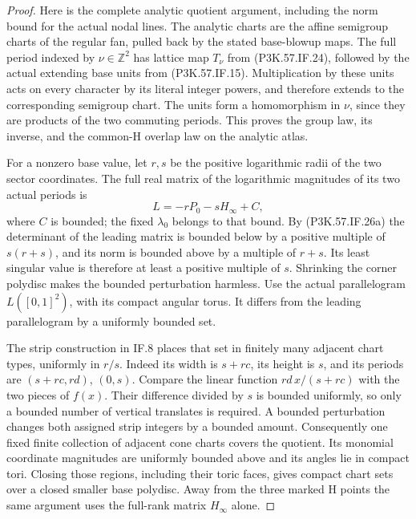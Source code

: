 \begin{proof}
Here is the complete analytic quotient argument, including the
norm bound for the actual nodal lines. The analytic charts are
the affine semigroup charts of the regular fan, pulled back by
the stated base-blowup maps. The full period indexed by
\(\nu\in\mathbb Z^2\) has lattice map \(T_\nu\) from
(P3K.57.IF.24), followed by the actual extending base units from
(P3K.57.IF.15). Multiplication by these units acts on every character
by its literal integer powers, and therefore extends to the
corresponding semigroup chart. The units form a homomorphism
in \(\nu\), since they are products of the two commuting
periods. This proves the group law, its inverse, and the
common-H overlap law on the analytic atlas.

For a nonzero base value, let \(r,s\) be the positive logarithmic
radii of the two sector coordinates. The full real matrix of
the logarithmic magnitudes of its two actual periods is
\[
                       L=-rP_0-sH_\infty+C,             \tag{P3K.57.IF.28a}
\]
where \(C\) is bounded; the fixed \(\lambda_0\) belongs
to that bound. By (P3K.57.IF.26a) the determinant of the leading
matrix is bounded below by a positive multiple of
\(s(r+s)\), and its norm is bounded above by a multiple
of \(r+s\). Its least singular value is therefore at
least a positive multiple of \(s\). Shrinking the corner
polydisc makes the bounded perturbation harmless. Use the
actual parallelogram \(L([0,1]^2)\), with its compact
angular torus. It differs from the leading parallelogram
by a uniformly bounded set.

The strip construction in IF.8 places that set in finitely
many adjacent chart types, uniformly in \(r/s\). Indeed
its width is \(s+rc\), its height is \(s\), and its
periods are \((s+rc,rd)\), \((0,s)\). Compare the
linear function \(rd\,x/(s+rc)\) with the two pieces
of \(f(x)\). Their difference divided by \(s\) is
bounded uniformly, so only a bounded number of vertical
translates is required. A bounded perturbation changes
both assigned strip integers by a bounded amount.
Consequently one fixed finite collection of adjacent
cone charts covers the quotient. Its monomial coordinate
magnitudes are uniformly bounded above and its angles
lie in compact tori. Closing those regions, including
their toric faces, gives compact chart sets over a
closed smaller base polydisc. Away from the three
marked H points the same argument uses the full-rank
matrix \(H_\infty\) alone.


\end{proof}
